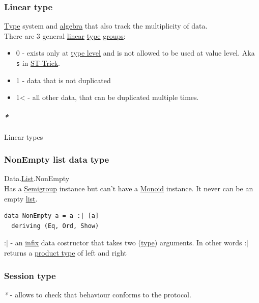 \documentclass[11pt]{article}
\begin{document}
\subsubsection{\label{orgc0bed17}Linear type}
\label{sec:orgd3d5a7c}
\hyperref[org4fbaeb8]{Type} system and \hyperref[orgecde2fc]{algebra} that also track the multiplicity of data.\\
There are 3 general \hyperref[orgb55e183]{linear} \hyperref[org4fbaeb8]{type} \hyperref[org7292335]{groups}:\\
\begin{itemize}
\item 0 - exists only at \hyperref[org01e5da3]{type level} and is not allowed to be used at value level. Aka \texttt{s} in \hyperref[org17bfb25]{ST-Trick}.\\
\item 1 - data that is not duplicated\\
\item 1< - all other data, that can be duplicated multiple times.\\
\end{itemize}

\paragraph{\emph{*}}
\label{sec:org04fa0c3}

\label{org1ba6d1b}Linear types\\

\subsubsection{\label{org691989d}NonEmpty list data type}
\label{sec:orgcb4ce4d}
Data.\hyperref[org8ae0f28]{List}.NonEmpty\\
Has a \hyperref[org936e299]{Semigroup} instance but can't have a \hyperref[org8ff50ea]{Monoid} instance. It never can be an empty \hyperref[org8ae0f28]{list}.\\

\begin{verbatim}
data NonEmpty a = a :| [a]
  deriving (Eq, Ord, Show)
\end{verbatim}

:| - an \hyperref[org80fcea9]{infix} data costructor that takes two (\hyperref[org4fbaeb8]{type}) arguments. In other words :| returns a \hyperref[orgb3527ef]{product type} of left and right\\

\subsubsection{\label{org6ce1eaa}Session type}
\label{sec:orgafb5090}
\emph{*} - allows to check that behaviour conforms to the protocol.\\
\end{document}
